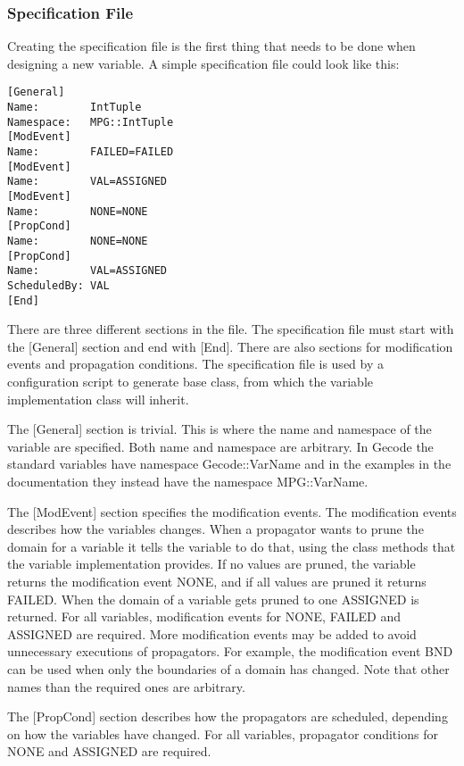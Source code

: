 \documentclass[a4paper,11pt]{article}
\begin{document}
\subsubsection{Specification File}
Creating the specification file is the first thing that needs to be done when designing a new variable.  A simple specification file could look like this:

\begin{lstlisting}[frame=single]
[General]
Name:        IntTuple
Namespace:   MPG::IntTuple
[ModEvent]
Name:        FAILED=FAILED
[ModEvent]
Name:        VAL=ASSIGNED
[ModEvent]
Name:        NONE=NONE
[PropCond]
Name:        NONE=NONE
[PropCond]
Name:        VAL=ASSIGNED
ScheduledBy: VAL
[End]
\end{lstlisting}
There are three different sections in the file. The specification file must start with the [General] section and end with [End]. There are also sections for modification events and propagation conditions. The specification file is used by a configuration script to generate base class, from which the variable implementation class will inherit.

The [General] section is trivial. This is where the name and namespace of the variable are specified. Both name and namespace are arbitrary. In Gecode the standard variables have namespace Gecode::VarName and in the examples in the documentation they instead have the namespace MPG::VarName.

The [ModEvent] section specifies the modification events. The modification events describes how the variables changes. When a propagator wants to prune the domain for a variable it tells the variable to do that, using the class methods that the variable implementation provides. If no values are pruned, the variable returns the modification event NONE, and if all values are pruned it returns FAILED. When the domain of a variable gets pruned to one ASSIGNED is returned. For all variables, modification events for NONE, FAILED and ASSIGNED are required. More modification events may be added to avoid unnecessary executions of propagators. For example, the modification event BND can be used when only the boundaries of a domain has changed. Note that other names than the required ones are arbitrary.

The [PropCond] section describes how the propagators are scheduled, depending on how the variables have changed. For all variables, propagator conditions for NONE and ASSIGNED are required.
\end{document}
